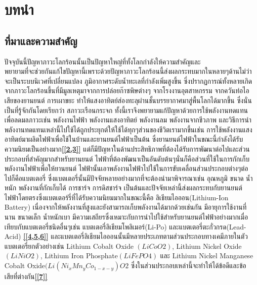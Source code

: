 \chapter{บทนำ}
\section{ที่มาและความสำคัญ}
	ปัจจุบันนี้ปัญหาภาวะโลกร้อนนั้นเป็นปัญหาใหญ่ที่ทั้งโลกกำลังให้ความสำคัญและ\\พยายามที่จะช่วยกันแก้ไขปัญหานี้เพราะด้วยปัญหาภาวะโลกร้อนนี้ส่งผลกระทบมากในหลายๆด้านไม่ว่าจะเป็นระบบนิเวศที่เปลี่ยนแปลง ภูมิอากาศระดับน้ำทะเลที่กำลังเพิ่มสูงขึ้น  ซี่งปรากฏการณ์ทั้งหลายเกิดจากภาวะโลกร้อนขึ้นที่มีมูลเหตุมาจากการปล่อยก๊าซพิษต่างๆ จากโรงงานอุตสาหกรรม จากควันท่อไอเสียของยานยนต์ การเผาขยะ ทำให้แสงอาทิตย์ส่องทะลุผ่านชั้นบรรยากาศมาสู่พื้นโลกได้มากขึ้น ซึ่งนั่นเป็นที่รู้จักกันโดยเรียกว่า สภาวะเรือนกระจก \textbf{\cite{[1]}} ทั้งนี้เราจึงพยายามแก้ปัญหาด้วยการใช้พลังงานทดแทนเพื่อลดมลภาวะเช่น พลังงานไฟฟ้า พลังงานแสงอาทิตย์ พลังงานลม พลังงานจากชีวภาพ และวิธีการนำพลังงานทดแทนเหล่านี้ไปใช้ได้ถูกประยุกต์ให้ใช้ได้ทุกๆส่วนของชีวิตเรามากขึ้นเช่น การใช้พลังงานแสงอาทิตย์มาผลิตไฟฟ้าเพื่อใช้ในบ้านและยานยนต์ไฟฟ้าเป็นต้น ซึ่งยานยนต์ไฟฟ้าในขณะนี้กำลังได้รับความนิยมเป็นอย่างมาก\textbf{\ref{[2,3]}} แต่ก็มีปัญหาในด้านประสิทธิภาพที่ต้องได้รับการพัฒนาต่อไปและส่วนประกอบที่สำคัญมากสำหรับยานยนต์ ไฟฟ้าที่ต้องพัฒนาเป็นอันดับต้นๆนั่นก็คือส่วนที่ใช้ในการกักเก็บพลังงานไฟฟ้าเพื่อให้ยานยนต์ ไฟฟ้านั้นเอาพลังงานไฟฟ้าไปใช้ในการขับเคลื่อนส่วนประกอบต่างๆต่อไปก็คือแบตเตอรี่ ซึ่งแบตเตอรี่นั้นมีปัจจัยหลายอย่างมากที่จะต้องนำมาพิจารณาเช่น อุณหภูมิ ขนาด น้ำหนัก พลังงานที่กักเก็บได้ การชาร์จ การดิสชาร์จ เป็นต้นและปัจจัยเหล่านี้ส่งผลกระทบกับยานยนต์ไฟฟ้าโดยตรงซึ่งแบตเตอร์รี่ที่ได้รับความนิยมมากในขณะนี้คือ ลิเธียมไอออน(Lithium-Ion Battery) เนื่องจากให้พลังงานที่สูงและยังสามารถเก็บพลังงานได้มากด้วยเช่นกัน มีอายุการใช้งานที่นาน ขนาดเล็ก น้ำหนักเบา มีความเสถียรซึ่งเหมาะกับการนำไปใช้สำหรับยานยนต์ไฟฟ้าอย่างมากเมื่อเทียบกับแบตเตอรี่ชนิดอื่นๆเช่น แบตเตอรี่ลิเธียมโพลิเมอร์(Li-Po) และแบตเตอรี่ตะกั่วกรด(Lead-Acid) \textbf{\ref{[4,5,6]}} และแบตเตอรี่ลิเธียมไอออนนั้นมีหลายประเภทตามส่วนประกอบทางเคมีภายในตัวแบตเตอรี่ยกตัวอย่างเช่น Lithium Cobalt Oxide
	$(LiCoO2)$, Lithium Nickel Oxide$(LiNiO2)$, Lithium Iron Phosphate$(LiFePO4)$ และ Lithium Nickel Manganese Cobalt Oxide$(Li(Ni_xMn_yCo_{1−x−y})O2$ ซึ่งในส่วนประกอบเหล่านี้จะทำให้ได้ข้อดีและข้อเสียที่ต่างกัน\textbf{\ref{[7]}}
